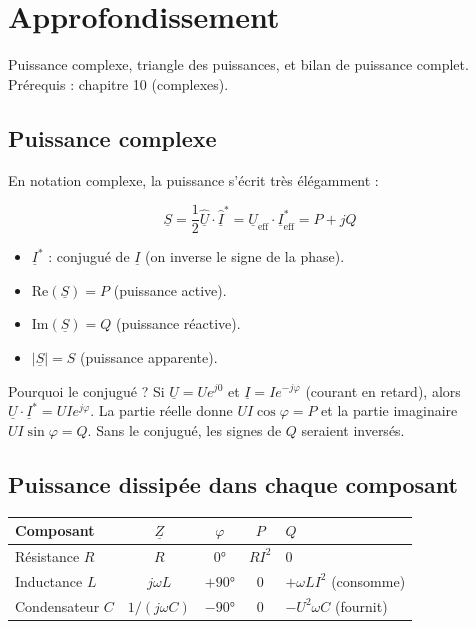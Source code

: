 \documentclass[12pt,a4paper,twoside]{book}
\begin{document}
\section{Approfondissement}

\begin{approfondissement}
Puissance complexe, triangle des puissances, et bilan de puissance complet. Prérequis : chapitre 10 (complexes).
\end{approfondissement}

\subsection{Puissance complexe}

En notation complexe, la puissance s'écrit très élégamment :

\begin{formule}
\[
\boxed{\underline{S} = \frac{1}{2}\underline{\hat{U}} \cdot \underline{\hat{I}}^* = \underline{U}_{\text{eff}} \cdot \underline{I}_{\text{eff}}^* = P + jQ}
\]
\begin{itemize}[nosep]
\item $\underline{I}^*$ : conjugué de $\underline{I}$ (on inverse le signe de la phase).
\item $\text{Re}(\underline{S}) = P$ (puissance active).
\item $\text{Im}(\underline{S}) = Q$ (puissance réactive).
\item $|\underline{S}| = S$ (puissance apparente).
\end{itemize}
\end{formule}

\begin{intuition}
Pourquoi le conjugué ? Si $\underline{U} = Ue^{j0}$ et $\underline{I} = Ie^{-j\varphi}$ (courant en retard), alors $\underline{U}\cdot\underline{I}^* = UIe^{j\varphi}$. La partie réelle donne $UI\cos\varphi = P$ et la partie imaginaire $UI\sin\varphi = Q$. Sans le conjugué, les signes de $Q$ seraient inversés.
\end{intuition}

\subsection{Puissance dissipée dans chaque composant}

\begin{center}
\renewcommand{\arraystretch}{1.5}
\begin{tabular}{lcccl}
\toprule
\textbf{Composant} & $\underline{Z}$ & $\varphi$ & $P$ & $Q$ \\
\midrule
Résistance $R$ & $R$ & $0°$ & $RI^2$ & $0$ \\
Inductance $L$ & $j\omega L$ & $+90°$ & $0$ & $+\omega LI^2$ (consomme) \\
Condensateur $C$ & $1/(j\omega C)$ & $-90°$ & $0$ & $-U^2\omega C$ (fournit) \\
\bottomrule
\end{tabular}
\end{center}
\end{document}
